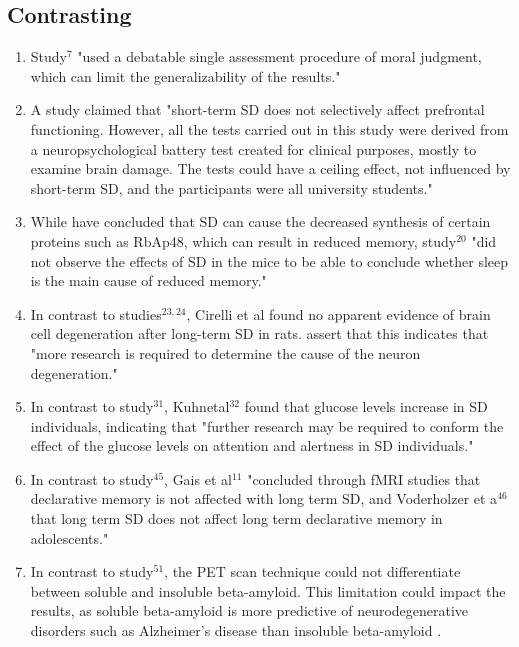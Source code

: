 \begin{centering}\subsection{Contrasting}\end{centering}

\begin{enumerate}

	\item Study$^7$ "used a debatable single assessment procedure of moral judgment, which can limit the generalizability of the results." \parencite{1}

	\item A study claimed that "short-term SD does not selectively affect prefrontal functioning. However, all the tests carried out in this study were derived from a neuropsychological battery test created for clinical purposes, mostly to examine brain damage. The tests could have a ceiling effect, not influenced by short-term SD, and the participants were all university students."

	\item While \citeauthor{1} have concluded that SD can cause the decreased synthesis of certain proteins such as RbAp48, which can result in reduced memory, study$^{20}$ "did not observe the effects of SD in the mice to be able to conclude whether sleep is the main cause of reduced memory."

	\item In contrast to studies$^{23,24}$, Cirelli et al found no apparent evidence of brain cell degeneration after long-term SD in rats. \citeauthor{1} assert that this indicates that "more research is required to determine the cause of the neuron degeneration."

	\item In contrast to study$^{31}$, Kuhnetal$^{32}$ found that glucose levels increase in SD individuals, indicating that "further research may be required to conform the effect of the glucose levels on attention and alertness in SD individuals."

	\item In contrast to study$^{45}$, Gais et al$^{11}$ "concluded through fMRI studies that declarative  memory is not affected with long term SD, and Voderholzer et a$^{46}$ that long term SD does not affect long term declarative memory in adolescents."

	\item In contrast to study$^{51}$, the PET scan technique could not differentiate between soluble and insoluble beta-amyloid. This limitation could impact the results, as soluble beta-amyloid is more predictive of neurodegenerative disorders such as Alzheimer’s disease than insoluble beta-amyloid \parencite{1}.


\end{enumerate}
